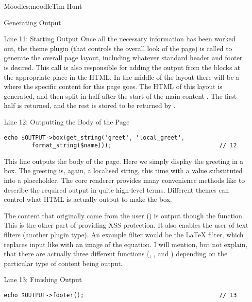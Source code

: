 \begin{aosachapter}{Moodle}{s:moodle}{Tim Hunt}
\begin{aosasect1}{Generating Output}
\begin{aosasect2}{Line 11: Starting Output}
Once all the necessary information has been worked out, the theme
plugin (that controls the overall look of the page) is called to
generate the overall page layout, including whatever standard header
and footer is desired. This call is also responsible for adding the
output from the blocks at the appropriate place in the HTML. In the
middle of the layout there will be a  where the specific content
for this page goes. The HTML of this layout is generated, and then
split in half after the start of the main content . The first half
is returned, and the rest is stored to be returned by
.

\end{aosasect2}

\begin{aosasect2}{Line 12: Outputting the Body of the Page}

\begin{verbatim}
echo $OUTPUT->box(get_string('greet', 'local_greet',
        format_string($name)));                               // 12
\end{verbatim}

This line outputs the body of the page. Here we simply display the
greeting in a box. The greeting is, again, a localised string, this time
with a value substituted into a placeholder. The core renderer
 provides many convenience methods like  to
describe the required output in quite high-level terms. Different
themes can control what HTML is actually output to make the box.

The content that originally came from the user () is
output though the  function. This is the other
part of providing XSS protection. It also enables the user of text
filters (another plugin type). An example filter would be the LaTeX
filter, which replaces input like  with an image
of the equation. I will mention, but not explain, that there are
actually three different functions (, ,
and ) depending on the particular type of content
being output.

\end{aosasect2}

\begin{aosasect2}{Line 13: Finishing Output}

\begin{verbatim}
echo $OUTPUT->footer();                                       // 13
\end{verbatim}


\end{aosasect2}
\end{aosasect1}
\end{aosachapter}
